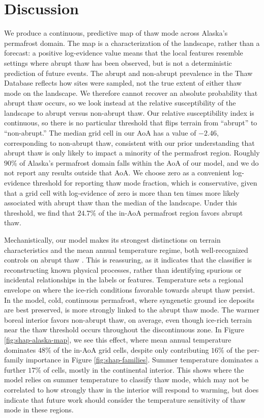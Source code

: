 \documentclass[../main.tex]{subfiles}
\begin{document}
\section{Discussion}

We produce a continuous, predictive map of thaw mode across Alaska's permafrost domain. The map is a characterization of the landscape, rather than a forecast: a positive log-evidence value means that the local features resemble settings where abrupt thaw has been observed, but is not a deterministic prediction of future events. The abrupt and non-abrupt prevalence in the Thaw Database reflects how sites were sampled, not the true extent of either thaw mode on the landscape. We therefore cannot recover an absolute probability that abrupt thaw occurs, so we look instead at the relative susceptibility of the landscape to abrupt versus non-abrupt thaw. Our relative susceptibility index is continuous, so there is no particular threshold that flips terrain from ``abrupt'' to ``non-abrupt.'' The median grid cell in our AoA has a value of $-2.46$, corresponding to non-abrupt thaw, consistent with our prior understanding that abrupt thaw is only likely to impact a minority of the permafrost region. Roughly $90\%$ of Alaska's permafrost domain falls within the AoA of our model, and we do not report any results outside that AoA. We choose zero as a convenient log-evidence threshold for reporting thaw mode fraction, which is conservative, given that a grid cell with log-evidence of zero is more than ten times more likely associated with abrupt thaw than the median of the landscape. Under this threshold, we find that $24.7\%$ of the in-AoA permafrost region favors abrupt thaw.

Mechanistically, our model makes its strongest distinctions on terrain characteristics and the mean annual temperature regime, both well-recognized controls on abrupt thaw \citep{kokelj2013advances, olefeldt2016circumpolar}. This is reassuring, as it indicates that the classifier is reconstructing known physical processes, rather than identifying spurious or incidental relationships in the labels or features. Temperature sets a regional envelope on where the ice-rich conditions favorable towards abrupt thaw persist. In the model, cold, continuous permafrost, where syngenetic ground ice deposits are best preserved, is more strongly linked to the abrupt thaw mode. The warmer boreal interior favors non-abrupt thaw, on average, even though ice-rich terrain near the thaw threshold occurs throughout the discontinuous zone. In Figure \ref{fig:shap-alaska-map}, we see this effect, where mean annual temperature dominates $48\%$ of the in-AoA grid cells, despite only contributing $16\%$ of the per-family importance in Figure \ref{fig:shap-families}. Summer temperature dominates a further $17\%$ of cells, mostly in the continental interior. This shows where the model relies on summer temperature to classify thaw mode, which may not be correlated to how strongly thaw in the interior will respond to warming, but does indicate that future work should consider the temperature sensitivity of thaw mode in these regions.
\end{document}
